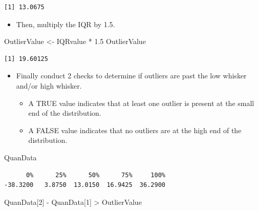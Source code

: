 \documentclass[
  letterpaper,
  DIV=11,
  numbers=noendperiod]{scrreprt}
\newenvironment{Shaded}{\begin{snugshade}}{\end{snugshade}}
\newcommand{\DecValTok}[1]{\textcolor[rgb]{0.68,0.00,0.00}{#1}}
\newcommand{\FloatTok}[1]{\textcolor[rgb]{0.68,0.00,0.00}{#1}}
\newcommand{\NormalTok}[1]{\textcolor[rgb]{0.00,0.23,0.31}{#1}}
\newcommand{\OtherTok}[1]{\textcolor[rgb]{0.00,0.23,0.31}{#1}}
\newcommand{\SpecialCharTok}[1]{\textcolor[rgb]{0.37,0.37,0.37}{#1}}
\providecommand{\tightlist}{%
  \setlength{\itemsep}{0pt}\setlength{\parskip}{0pt}}\usepackage{longtable,booktabs,array}
\begin{document}
\begin{verbatim}
[1] 13.0675
\end{verbatim}

\begin{itemize}
\tightlist
\item
  Then, multiply the IQR by 1.5.
\end{itemize}

\begin{Shaded}
\begin{Highlighting}[]
\NormalTok{OutlierValue }\OtherTok{\textless{}{-}}\NormalTok{ IQRvalue }\SpecialCharTok{*} \FloatTok{1.5}
\NormalTok{OutlierValue}
\end{Highlighting}
\end{Shaded}

\begin{verbatim}
[1] 19.60125
\end{verbatim}

\begin{itemize}
\item
  Finally conduct 2 checks to determine if outliers are past the low
  whisker and/or high whisker.

  \begin{itemize}
  \tightlist
  \item
    A TRUE value indicates that at least one outlier is present at the
    small end of the distribution.
  \item
    A FALSE value indicates that no outliers are at the high end of the
    distribution.
  \end{itemize}
\end{itemize}

\begin{Shaded}
\begin{Highlighting}[]
\NormalTok{QuanData}
\end{Highlighting}
\end{Shaded}

\begin{verbatim}
      0%      25%      50%      75%     100% 
-38.3200   3.8750  13.0150  16.9425  36.2900 
\end{verbatim}

\begin{Shaded}
\begin{Highlighting}[]
\NormalTok{QuanData[}\DecValTok{2}\NormalTok{] }\SpecialCharTok{{-}}\NormalTok{ QuanData[}\DecValTok{1}\NormalTok{] }\SpecialCharTok{\textgreater{}}\NormalTok{ OutlierValue}
\end{Highlighting}
\end{Shaded}
\end{document}
